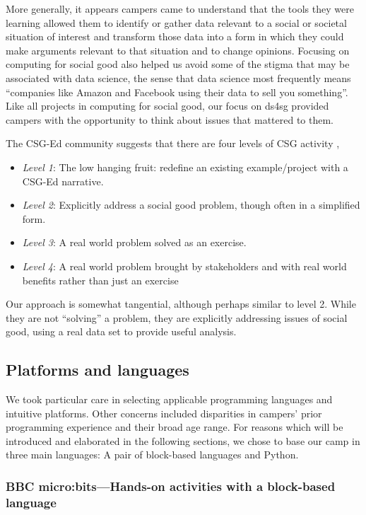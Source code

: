 More generally, it appears campers came to understand that the
tools they were learning allowed them to identify or gather data
relevant to a social or societal situation of interest and transform
those data into a form in which they could make arguments relevant
to that situation and to change opinions.  Focusing on computing
for social good also helped us avoid some of the stigma that may
be associated with data science, the sense that data science most
frequently means ``companies like Amazon and Facebook using their
data to sell you something''.  Like all projects in computing for
social good, our focus on ds4sg provided campers with the opportunity
to think about issues that mattered to them.

The CSG-Ed community suggests that there are four levels of CSG
activity \cite{Goldweber2018},

\begin{itemize}
\item \textit{Level 1}: The low hanging fruit: redefine an existing
  example/project with a CSG-Ed narrative.
\item \textit{Level 2}: Explicitly address a social good problem,
  though often in a simplified form.
\item \textit{Level 3}: A real world problem solved as an
  exercise.
\item \textit{Level 4}: A real world problem brought by stakeholders
  and with real world benefits rather than just an exercise
\end{itemize}

\noindent
Our approach is somewhat tangential, although perhaps similar to
level 2.  While they are not ``solving'' a problem, they are
explicitly addressing issues of social good, using a real data set
to provide useful analysis.



\subsection{Platforms and languages}

We took particular care in selecting applicable programming languages
and intuitive platforms. Other concerns 
included disparities in campers' prior programming experience and
their broad age range. For reasons which will be introduced and
elaborated in the following sections, we chose to base our camp in
three main languages: A pair of block-based languages and Python.

\subsubsection{BBC micro:bits---Hands-on activities with a block-based language}

